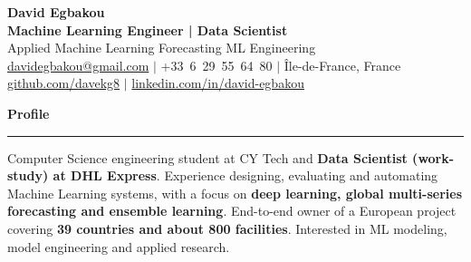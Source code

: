 \documentclass[10pt,a4paper]{article}
\newenvironment{rSection}[1]{%
    \par\vspace{5pt}
    \noindent
    {\large\bfseries\color{navy}#1}\par
    \vspace{-3pt}
    {\color{lightgrey}\rule{\linewidth}{0.7pt}}
    \par\vspace{-5pt}
}{%
    \par\vspace{2pt}
}
\begin{document}

\begin{center}

{\Huge\bfseries\color{dark} David Egbakou}\\[4pt]

{\large\bfseries\color{navy}
Machine Learning Engineer | Data Scientist
}\\[3pt]

{\small\color{grey}
Applied Machine Learning \textbullet{}
 Forecasting \textbullet{} ML Engineering
}\\[7pt]

{\small
\href{mailto:davidegbakou@gmail.com}
{davidegbakou@gmail.com}
\quad$\vert$\quad
+33~6~29~55~64~80
\quad$\vert$\quad
Île-de-France, France
}\\[4pt]

{\small
\href{https://github.com/davekg8}
{github.com/davekg8}
\quad$\vert$\quad
\href{https://www.linkedin.com/in/david-egbakou}
{linkedin.com/in/david-egbakou}
}

\end{center}

\vspace{-4pt}


\begin{rSection}{Profile}

Computer Science engineering student at CY Tech and
\textbf{Data Scientist (work-study) at DHL Express}.
Experience designing, evaluating and automating
Machine Learning systems, with a focus on
\textbf{deep learning, global multi-series forecasting
and ensemble learning}.
End-to-end owner of a European project covering
\textbf{39 countries and about 800 facilities}.
Interested in ML modeling, model engineering
and applied research.


\end{rSection}

\end{document}
